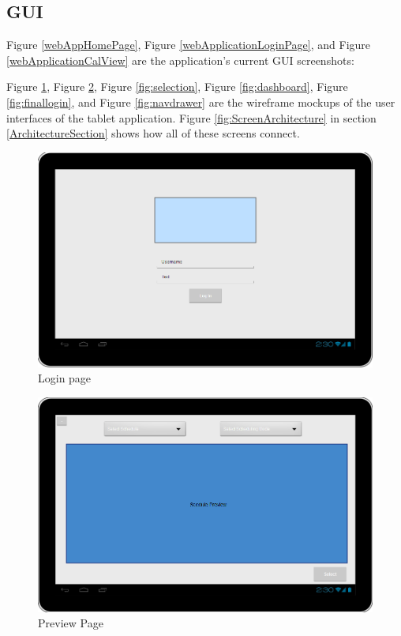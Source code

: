 \subsection{GUI}
Figure \ref{webAppHomePage}, Figure \ref{webApplicationLoginPage}, and Figure \ref{webApplicationCalView} are the application's current GUI screenshots:


Figure \ref{fig:login}, Figure \ref{fig:firstview}, Figure \ref{fig:selection}, Figure \ref{fig:dashboard}, Figure \ref{fig:finallogin}, and Figure \ref{fig:navdrawer} are the wireframe mockups of the user interfaces of the tablet application.  Figure \ref{fig:ScreenArchitecture} in section \ref{ArchitectureSection} shows how all of these screens connect.
 
\begin{figure}
\centering
  \includegraphics[scale=0.4]{login.png}
  \caption{Login page}
  \label{fig:login}
\end{figure}


\begin{figure}
\centering
  \includegraphics[scale=0.4]{firstview.png}
  \caption{Preview Page}
  \label{fig:firstview}
\end{figure}

